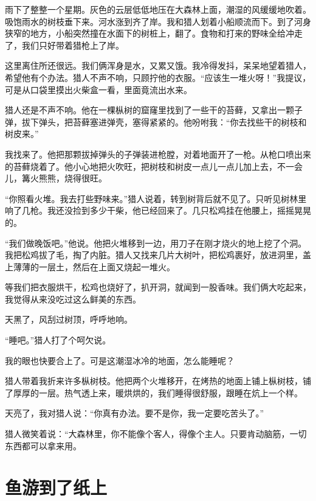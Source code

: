 \documentclass[12pt,UTF-8,openany]{ctexbook}
\begin{document}
\begin{large}
    
    雨下了整整一个星期。灰色的云层低低地压在大森林上面，潮湿的风缓缓地吹着。吸饱雨水的树枝垂下来。河水涨到齐了岸。我和猎人划着小船顺流而下。到了河身狭窄的地方，小船突然撞在水面下的树桩上，翻了。食物和打来的野味全给冲走了，我们只好带着猎枪上了岸。
    
    这里离住所还很远。我们俩浑身是水，又累又饿。我冷得发抖，呆呆地望着猎人，希望他有个办法。猎人不声不响，只顾拧他的衣服。“应该生一堆火呀！”我提议，可是从口袋里摸出火柴盒一看，里面竟流出水来。
    
    猎人还是不声不响。他在一棵枞树的窟窿里找到了一些干的苔藓，又拿出一颗子弹，拔下弹头，把苔藓塞进弹壳，塞得紧紧的。他吩咐我：“你去找些干的树枝和树皮来。”
    
    我找来了。他把那颗拔掉弹头的子弹装进枪膛，对着地面开了一枪。从枪口喷出来的苔藓烧着了。他小心地把火吹旺，把树枝和树皮一点儿一点儿加上去，不一会儿，篝火熊熊，烧得很旺。
    
    “你照看火堆。我去打些野味来。”猎人说着，转到树背后就不见了。只听见树林里响了几枪。我还没捡到多少干柴，他已经回来了。几只松鸡挂在他腰上，摇摇晃晃的。
    
    “我们做晚饭吧。”他说。他把火堆移到一边，用刀子在刚才烧火的地上挖了个洞。我把松鸡拔了毛，掏了内脏。猎人又找来几片大树叶，把松鸡裹好，放进洞里，盖上薄薄的一层土，然后在上面又烧起一堆火。
    
    等我们把衣服烘干，松鸡也烧好了，扒开洞，就闻到一股香味。我们俩大吃起来，我觉得从来没吃过这么鲜美的东西。
    
    天黑了，风刮过树顶，呼呼地响。
    
    “睡吧。”猎人打了个呵欠说。
    
    我的眼也快要合上了。可是这潮湿冰冷的地面，怎么能睡呢？
    
    猎人带着我折来许多枞树枝。他把两个火堆移开，在烤热的地面上铺上枞树枝，铺了厚厚的一层。热气透上来，暖烘烘的，我们睡得很舒服，跟睡在炕上一个样。
    
    天亮了，我对猎人说：“你真有办法。要不是你，我一定要吃苦头了。”
    
    猎人微笑着说：“大森林里，你不能像个客人，得像个主人。只要肯动脑筋，一切东西都可以拿来用。
    
\end{large}



\chapter{鱼游到了纸上}
\end{document}
